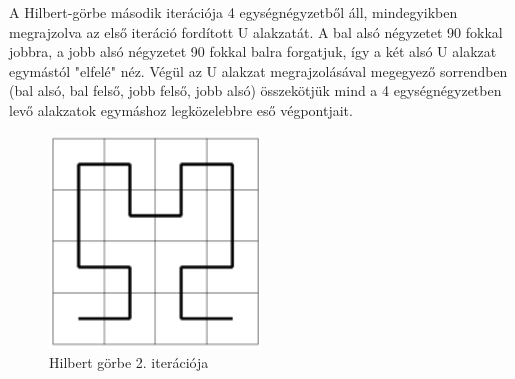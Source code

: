 A Hilbert-görbe második iterációja 4 egységnégyzetből áll, mindegyikben megrajzolva az első iteráció fordított U alakzatát. A bal alsó négyzetet 90 fokkal jobbra, a jobb alsó négyzetet 90 fokkal balra forgatjuk, így a két alsó U alakzat egymástól "elfelé" néz. Végül az U alakzat megrajzolásával megegyező sorrendben (bal alsó, bal felső, jobb felső, jobb alsó) összekötjük mind a 4 egységnégyzetben levő alakzatok egymáshoz legközelebbre eső végpontjait.
\begin{figure}[!ht]
	\begin{center}
	\includegraphics[width=0.5\textwidth]{img/HilbertCurve2-1}
	\caption[labelInTOC]{Hilbert görbe 2. iterációja}
\end{center}
\end{figure}


